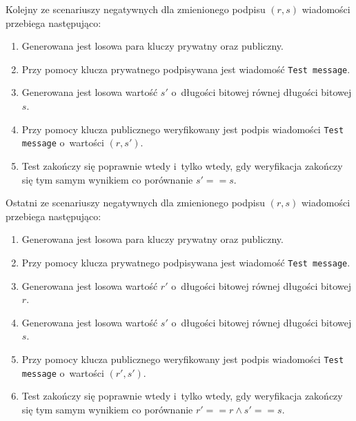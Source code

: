 \documentclass{article}
\begin{document}
        Kolejny ze scenariuszy negatywnych dla zmienionego podpisu $(r, s)$ wiadomości przebiega następująco:
        
        \begin{enumerate}
            \item Generowana jest losowa para kluczy prywatny oraz publiczny.
            \item Przy pomocy klucza prywatnego podpisywana jest wiadomość \verb+Test message+.
            \item Generowana jest losowa wartość $s'$ o~długości bitowej równej długości bitowej $s$.
            \item Przy pomocy klucza publicznego weryfikowany jest podpis wiadomości \verb+Test message+ o~wartości $(r, s')$.
            \item Test zakończy się poprawnie wtedy i~tylko wtedy, gdy weryfikacja zakończy się tym samym wynikiem co porównanie $s' == s$.
        \end{enumerate}
        
        Ostatni ze scenariuszy negatywnych dla zmienionego podpisu $(r, s)$ wiadomości przebiega następująco:
        
        \begin{enumerate}
            \item Generowana jest losowa para kluczy prywatny oraz publiczny.
            \item Przy pomocy klucza prywatnego podpisywana jest wiadomość \verb+Test message+.
            \item Generowana jest losowa wartość $r'$ o~długości bitowej równej długości bitowej $r$.
            \item Generowana jest losowa wartość $s'$ o~długości bitowej równej długości bitowej $s$.
            \item Przy pomocy klucza publicznego weryfikowany jest podpis wiadomości \verb+Test message+ o~wartości $(r', s')$.
            \item Test zakończy się poprawnie wtedy i~tylko wtedy, gdy weryfikacja zakończy się tym samym wynikiem co porównanie $r' == r \wedge s' == s$.
        \end{enumerate}
        
\end{document}
